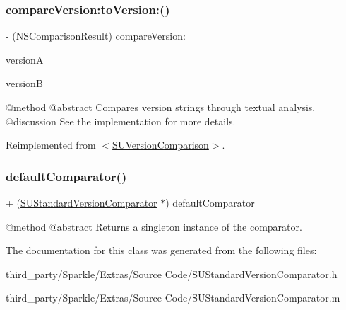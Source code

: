 \subsubsection{\texorpdfstring{compareVersion:toVersion:()}{compareVersion:toVersion:()}}
{\footnotesize\ttfamily -\/ (N\+S\+Comparison\+Result) compare\+Version\+: \begin{DoxyParamCaption}\item[{(N\+S\+String $\ast$)}]{versionA }\item[{to\+Version\+:(N\+S\+String $\ast$)}]{versionB }\end{DoxyParamCaption}}

@method @abstract Compares version strings through textual analysis. @discussion See the implementation for more details. 

Reimplemented from \mbox{\hyperlink{protocol_s_u_version_comparison-p_a7ee54ef49cade9b0a856bdc8c7fff2f4}{$<$\+S\+U\+Version\+Comparison$>$}}.

\mbox{\label{interface_s_u_standard_version_comparator_a67be5d5bf36c4774432d912261cb3048}} 
\subsubsection{\texorpdfstring{defaultComparator()}{defaultComparator()}}
{\footnotesize\ttfamily + (\mbox{\hyperlink{interface_s_u_standard_version_comparator}{S\+U\+Standard\+Version\+Comparator}} $\ast$) default\+Comparator \begin{DoxyParamCaption}{ }\end{DoxyParamCaption}}

@method @abstract Returns a singleton instance of the comparator. 

The documentation for this class was generated from the following files\+:\begin{DoxyCompactItemize}
\item 
third\+\_\+party/\+Sparkle/\+Extras/\+Source Code/S\+U\+Standard\+Version\+Comparator.\+h\item 
third\+\_\+party/\+Sparkle/\+Extras/\+Source Code/S\+U\+Standard\+Version\+Comparator.\+m\end{DoxyCompactItemize}
